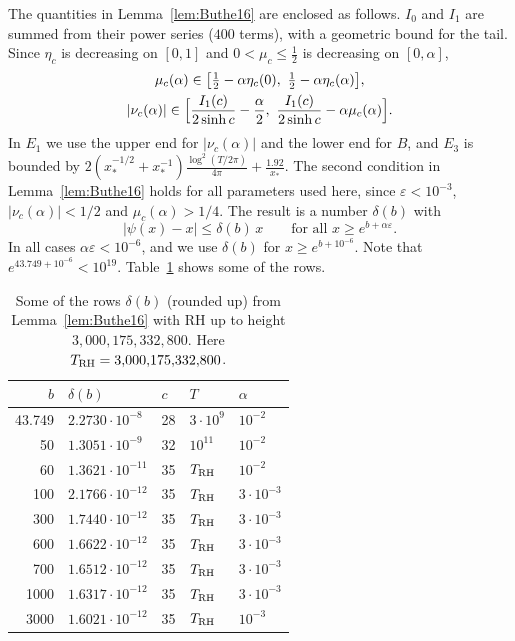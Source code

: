 \documentclass{amsart}
\theoremstyle{definition}
\theoremstyle{remark}
\theoremstyle{plain}
\numberwithin{equation}{section}
\newcommand{\eps}{\varepsilon}
\newcommand{\HRH}{3{,}000{,}175{,}332{,}800}
\begin{document}
The quantities in Lemma~\ref{lem:Buthe16} are enclosed as follows. $I_0$ and $I_1$ are summed from their power series ($400$ terms), with a geometric bound for the tail. Since $\eta_c$ is decreasing on $[0,1]$ and $0<\mu_c\le\frac12$ is decreasing on $[0,\alpha]$,
\begin{gather*}
\mu_c(\alpha)\in\bigl[\tfrac12-\alpha\eta_c(0),\ \tfrac12-\alpha\eta_c(\alpha)\bigr],\\
|\nu_c(\alpha)|\in\Bigl[\frac{I_1(c)}{2\sinh c}-\frac\alpha2,\ \frac{I_1(c)}{2\sinh c}-\alpha\mu_c(\alpha)\Bigr].
\end{gather*}
In $E_1$ we use the upper end for $|\nu_c(\alpha)|$ and the lower end for $B$, and $E_3$ is bounded by $2(x_*^{-1/2}+x_*^{-1})\frac{\log^2(T/2\pi)}{4\pi}+\frac{1.92}{x_*}$. The second condition in Lemma~\ref{lem:Buthe16} holds for all parameters used here, since $\eps<10^{-3}$, $|\nu_c(\alpha)|<1/2$ and $\mu_c(\alpha)>1/4$. The result is a number $\delta(b)$ with
\[
|\psi(x)-x|\le\delta(b)\,x\qquad\text{for all }x\ge e^{b+\alpha\eps}.
\]
In all cases $\alpha\eps<10^{-6}$, and we use $\delta(b)$ for $x\ge e^{b+10^{-6}}$. Note that $e^{43.749+10^{-6}}<10^{19}$. Table~\ref{tab:delta} shows some of the rows.

\begin{table}[ht]
\caption{Some of the rows $\delta(b)$ (rounded up) from Lemma~\ref{lem:Buthe16} with RH up to height $\HRH$. Here $T_{\rm RH}=\HRH$.}\label{tab:delta}
\small
\begin{tabular}{rllll}
\toprule
$b$ & $\delta(b)$ & $c$ & $T$ & $\alpha$\\
\midrule
43.749 & $2.2730\cdot10^{-8}$  & 28 & $3\cdot10^{9}$ & $10^{-2}$\\
50     & $1.3051\cdot10^{-9}$  & 32 & $10^{11}$ & $10^{-2}$\\
60     & $1.3621\cdot10^{-11}$ & 35 & $T_{\rm RH}$ & $10^{-2}$\\
100    & $2.1766\cdot10^{-12}$ & 35 & $T_{\rm RH}$ & $3\cdot10^{-3}$\\
300    & $1.7440\cdot10^{-12}$ & 35 & $T_{\rm RH}$ & $3\cdot10^{-3}$\\
600    & $1.6622\cdot10^{-12}$ & 35 & $T_{\rm RH}$ & $3\cdot10^{-3}$\\
700    & $1.6512\cdot10^{-12}$ & 35 & $T_{\rm RH}$ & $3\cdot10^{-3}$\\
1000   & $1.6317\cdot10^{-12}$ & 35 & $T_{\rm RH}$ & $3\cdot10^{-3}$\\
3000   & $1.6021\cdot10^{-12}$ & 35 & $T_{\rm RH}$ & $10^{-3}$\\
\bottomrule
\end{tabular}
\end{table}
\end{document}
